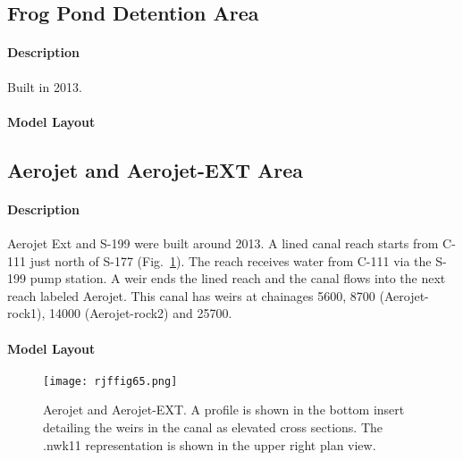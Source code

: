 \clearpage


\subsection{Frog Pond Detention Area}

\paragraph{Description}
Built in 2013.

\paragraph{Model Layout}



\clearpage
\subsection{Aerojet and Aerojet-EXT Area}

\paragraph{Description}
Aerojet Ext and S-199 were built around 2013.
A lined canal reach starts from C-111 just north of S-177 (Fig.~\ref{fig:rjffig65}).
The reach receives water from C-111 via the S-199 pump station.
A weir ends the lined reach and the canal flows into the next reach labeled Aerojet.
This canal has weirs at chainages 5600, 8700 (Aerojet-rock1), 14000 (Aerojet-rock2) and 25700.

\paragraph{Model Layout}



\begin{figure}[!h]
  \begin{center}
  \texttt{[image: rjffig65.png]}
  \caption[Aerojet and Aerojet-EXT.]{Aerojet and Aerojet-EXT. A profile is shown in the bottom insert detailing the weirs in the canal as elevated cross sections. The .nwk11 representation is shown in the upper right plan view.}
  \label{fig:rjffig65}
  \end{center}
\end{figure}



\clearpage

\cleardoublepage

